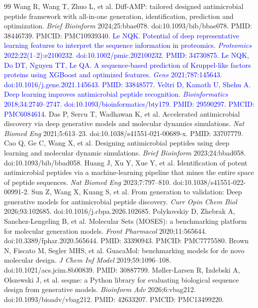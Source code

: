 \documentclass[unnumsec,webpdf,contemporary,large]{oup-authoring-template}
\newcommand{\rev}[1]{\textcolor{blue}{#1}}
\begin{document}
\begin{thebibliography}{99}
 Wang R, Wang T, Zhuo L, et al. Diff-AMP: tailored designed antimicrobial peptide framework with all-in-one generation, identification, prediction and optimization. \textit{Brief Bioinform} 2024;25:bbae078. doi:10.1093/bib/bbae078. PMID: 38446739. PMCID: PMC10939340.
 \rev{Le NQK. Potential of deep representative learning features to interpret the sequence information in proteomics. \textit{Proteomics} 2022;22(1--2):e2100232. doi:10.1002/pmic.202100232. PMID: 34730875.}
 \rev{Le NQK, Do DT, Nguyen TT, Le QA. A sequence-based prediction of Kruppel-like factors proteins using XGBoost and optimized features. \textit{Gene} 2021;787:145643. doi:10.1016/j.gene.2021.145643. PMID: 33848577.}
 \rev{Veltri D, Kamath U, Shehu A. Deep learning improves antimicrobial peptide recognition. \textit{Bioinformatics} 2018;34:2740--2747. doi:10.1093/bioinformatics/bty179. PMID: 29590297. PMCID: PMC6084614.}
 Das P, Sercu T, Wadhawan K, et al. Accelerated antimicrobial discovery via deep generative models and molecular dynamics simulations. \textit{Nat Biomed Eng} 2021;5:613--23. doi:10.1038/s41551-021-00689-x. PMID: 33707779.
 Cao Q, Ge C, Wang X, et al. Designing antimicrobial peptides using deep learning and molecular dynamic simulations. \textit{Brief Bioinform} 2023;24:bbad058. doi:10.1093/bib/bbad058.
 Huang J, Xu Y, Xue Y, et al. Identification of potent antimicrobial peptides via a machine-learning pipeline that mines the entire space of peptide sequences. \textit{Nat Biomed Eng} 2023;7:797--810. doi:10.1038/s41551-022-00991-2.
 Sun Z, Wang X, Kuang S, et al. From generation to validation: Deep generative models for antimicrobial peptide discovery. \textit{Curr Opin Chem Biol} 2026;93:102685. doi:10.1016/j.cbpa.2026.102685.
 Polykovskiy D, Zhebrak A, Sanchez-Lengeling B, et al. Molecular Sets (MOSES): a benchmarking platform for molecular generation models. \textit{Front Pharmacol} 2020;11:565644. doi:10.3389/fphar.2020.565644. PMID: 33390943. PMCID: PMC7775580.
 Brown N, Fiscato M, Segler MHS, et al. GuacaMol: benchmarking models for de novo molecular design. \textit{J Chem Inf Model} 2019;59:1096--108. doi:10.1021/acs.jcim.8b00839. PMID: 30887799.
 Møller-Larsen R, Izdebski A, Olszewski J, et al. seqme: a Python library for evaluating biological sequence design from generative models. \textit{Bioinform Adv} 2026;6:vbag212. doi:10.1093/bioadv/vbag212. PMID: 42633207. PMCID: PMC13499220.

\end{thebibliography}
\end{document}
